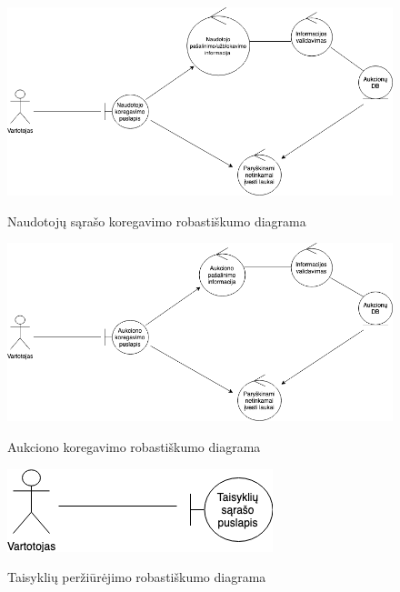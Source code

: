 \documentclass{VUMIFPSkursinis}
\begin{document}
		\begin{figure}[H]
		\centering
		\includegraphics[width=\linewidth]{img/pasalinti.png}
		\label{fig:salinti}
		\caption{Naudotojų sąrašo koregavimo robastiškumo diagrama}
	\end{figure}

		\begin{figure}[H]
		\centering
		\includegraphics[width=\linewidth]{img/aukcpasalinti.png}
		\label{fig:aukckoreg}
		\caption{Aukciono koregavimo robastiškumo diagrama}
	\end{figure}

		\begin{figure}[H]
		\centering
		\includegraphics[width=\linewidth]{img/taisykles.png}
		\label{fig:taisykles}
		\caption{Taisyklių peržiūrėjimo robastiškumo diagrama}
	\end{figure}
\end{document}
